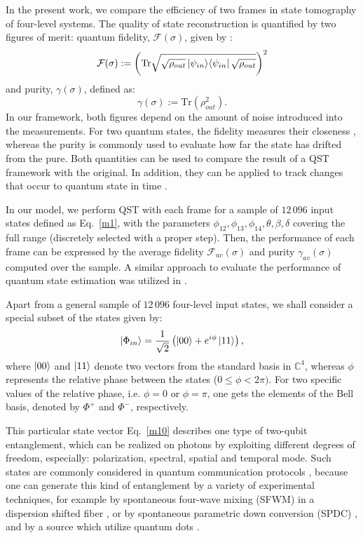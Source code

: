 \documentclass[aps,pra,reprint,groupedaddress,showkeys]{revtex4-1}
\renewcommand{\eqref}[1]{Eq.~\ref{#1}}
\newcommand{\tr}{{\mathrm{Tr}}}
\begin{document}
In the present work, we compare the efficiency of two frames in state tomography of four-level systems. The quality of state reconstruction is quantified by two figures of merit: quantum fidelity, $\mathcal{F} (\sigma)$, given by \cite{Nielsen2000}:
\begin{equation}\label{m9}
\mathcal{F} (\sigma) := \left(\tr \sqrt{\sqrt{\rho_{out}}\ket{\psi_{in}} \!\bra{\psi_{in}} \sqrt{\rho_{out}}} \right)^2
\end{equation}
and purity, $\gamma (\sigma)$, defined as:
\begin{equation}
\gamma (\sigma) :=  \tr \left( \rho_{out}^2 \right).
\end{equation}
In our framework, both figures depend on the amount of noise introduced into the measurements. For two quantum states, the fidelity measures their closeness \cite{Uhlmann1986,Jozsa1994}, whereas the purity is commonly used to evaluate how far the state has drifted from the pure. Both quantities can be used to compare the result of a QST framework with the original. In addition, they can be applied to track changes that occur to quantum state in time \cite{Czerwinski2020d}.

In our model, we perform QST with each frame for a sample of $12\,096$ input states defined as \eqref{m1}, with the parameters $ \phi_{12}, \phi_{13}, \phi_{14}, \theta,\beta, \delta$ covering the full range (discretely selected with a proper step). Then, the performance of each frame can be expressed by the average fidelity $\mathcal{F}_{av} (\sigma)$ and purity $\gamma_{av} (\sigma)$ computed over the sample. A similar approach to evaluate the performance of quantum state estimation was utilized in \cite{SedziakKacprowicz2020,Czerwinski2020b}.

Apart from a general sample of $12\,096$ four-level input states, we shall consider a special subset of the states given by:
\begin{equation}\label{m10}
\ket{\Phi_{in}} = \frac{1}{\sqrt{2}} \left(\ket{00} + e^{i \phi} \ket{11} \right),
\end{equation}
where $\ket{00}$ and $\ket{11}$ denote two vectors from the standard basis in $\mathbb{C}^4$, whereas $\phi$ represents the relative phase between the states ($0\leq \phi < 2 \pi)$. For two specific values of the relative phase, i.e. $\phi = 0$ or $\phi = \pi$, one gets the elements of the Bell basis, denoted by $\Phi^+$ and $\Phi^-$, respectively.

This particular state vector \eqref{m10} describes one type of two-qubit entanglement, which can be realized on photons by exploiting different degrees of freedom, especially: polarization, spectral, spatial and temporal mode. Such states are commonly considered in quantum communication protocols \cite{Wang2009,Herbauts2013}, because one can generate this kind of entanglement by a variety of experimental techniques, for example by spontaneous four-wave mixing (SFWM) in a dispersion shifted fiber \cite{Takesue2005,Takesue2009}, or by spontaneous parametric down conversion (SPDC) \cite{Marcikic2004,Shimizu2009}, and by a source which utilize quantum dots \cite{Jayakumar2014,Versteegh2015}.
\end{document}
